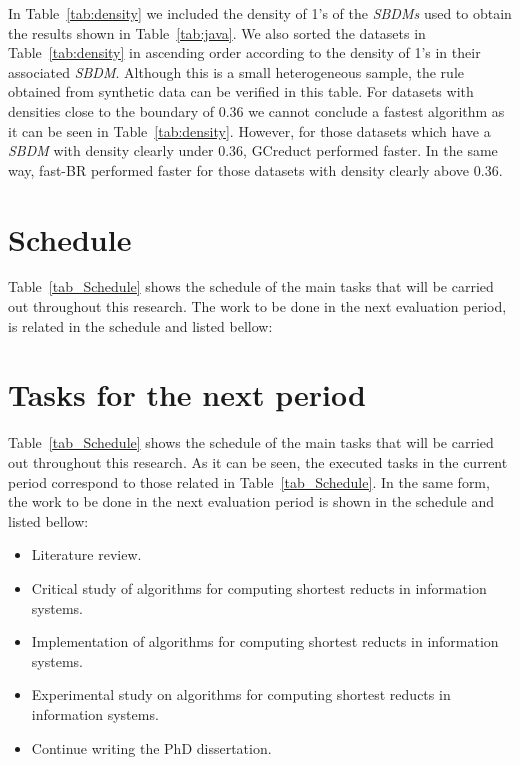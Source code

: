 \documentclass[authoryear,11pt]{elsarticle}
\begin{document}
  In Table~\ref{tab:density} we included the density of 1's of the \textit{SBDMs} used to obtain the results shown in Table~\ref{tab:java}. We also sorted the datasets in Table~\ref{tab:density} in ascending order according to the density of 1's in their associated \textit{SBDM}. Although this is a small heterogeneous sample, the rule obtained from synthetic data can be verified in this table. For datasets with densities close to the boundary of 0.36 we cannot conclude a fastest algorithm as it can be seen in Table~\ref{tab:density}. However, for those datasets which have a \textit{SBDM} with density clearly under 0.36, GCreduct performed faster. In the same way, fast-BR performed faster for those datasets with density clearly above 0.36.

\section{Schedule}\label{sec_schedule}
  Table~\ref{tab_Schedule} shows the schedule of the main tasks that will be carried out throughout this research. The work to be done in the next evaluation period, is related in the schedule and listed bellow:

\section{Tasks for the next period}\label{sec_schedule}
  Table~\ref{tab_Schedule} shows the schedule of the main tasks that will be carried out throughout this research. As it can be seen, the executed tasks in the current period correspond to those related in Table~\ref{tab_Schedule}. In the same form, the work to be done in the next evaluation period is shown in the schedule and listed bellow:
  
  \begin{itemize}
  	\itemsep0em 
  	\item Literature review.
  	\item Critical study of algorithms for computing shortest reducts in information systems.
  	\item Implementation of algorithms for computing shortest reducts in information systems.
  	\item Experimental study on algorithms for computing shortest reducts in information systems.
  	\item Continue writing the PhD dissertation.
  \end{itemize}
  
\end{document}
